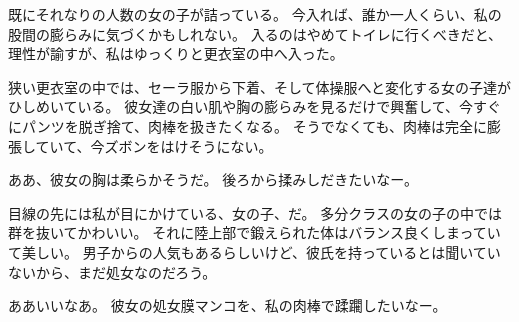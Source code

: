 既にそれなりの人数の女の子が詰っている。
今入れば、誰か一人くらい、私の股間の膨らみに気づくかもしれない。
入るのはやめてトイレに行くべきだと、理性が諭すが、私はゆっくりと更衣室の中へ入った。

狭い更衣室の中では、セーラ服から下着、そして体操服へと変化する女の子達がひしめいている。
彼女達の白い肌や胸の膨らみを見るだけで興奮して、今すぐにパンツを脱ぎ捨て、肉棒を扱きたくなる。
そうでなくても、肉棒は完全に膨張していて、今ズボンをはけそうにない。

ああ、彼女の胸は柔らかそうだ。
後ろから揉みしだきたいなー。

目線の先には私が目にかけている、女の子、だ。
多分クラスの女の子の中では群を抜いてかわいい。
それに陸上部で鍛えられた体はバランス良くしまっていて美しい。
男子からの人気もあるらしいけど、彼氏を持っているとは聞いていないから、まだ処女なのだろう。

ああいいなあ。
彼女の処女膜マンコを、私の肉棒で蹂躙したいなー。


